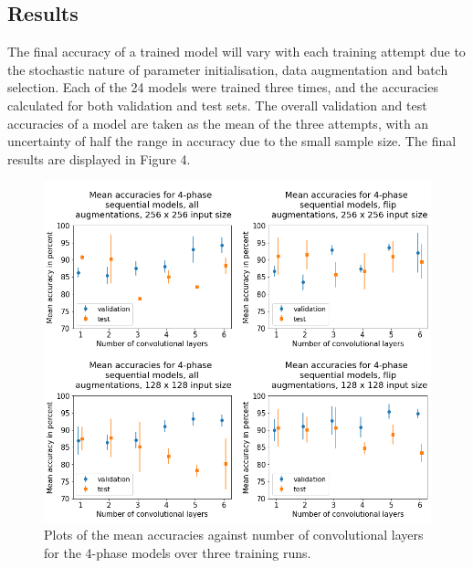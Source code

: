 \documentclass[12pt]{article}
\begin{document}
\subsection{Results}
The final accuracy of a trained model will vary with each training attempt due to the stochastic nature of parameter initialisation, data augmentation and batch selection. Each of the 24 models were trained three times, and the accuracies calculated for both validation and test sets. The overall validation and test accuracies of a model are taken as the mean of the three attempts, with an uncertainty of half the range in accuracy due to the small sample size. The final results are displayed in Figure 4.
\begin{figure}[h]
	\centering
    \includegraphics[width=6.6in]{images/4-phase_graphs.png}
    \caption{Plots of the mean accuracies against number of convolutional layers for the 4-phase models over three training runs.}
\end{figure} 
\end{document}
